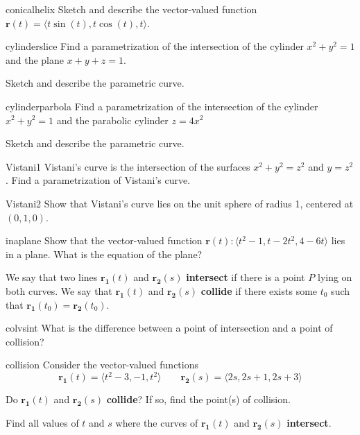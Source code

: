 \begin{problem}{conicalhelix}
Sketch and describe the vector-valued function $\bm{r}(t) = \langle t\sin(t), t\cos(t), t \rangle$.  
\end{problem}

\begin{problem}{cylinderslice}
Find a parametrization of the intersection of the cylinder $x^2 + y^2 = 1$ and the plane $x + y + z = 1$.

Sketch and describe the parametric curve.
\end{problem}

\begin{problem}{cylinderparbola}
Find a parametrization of the intersection of the cylinder $x^2 + y^2 = 1$ and the parabolic cylinder $z = 4x^2$

Sketch and describe the parametric curve.
\end{problem}

\begin{problem}{Vistani1}
Vistani's curve is the intersection of the surfaces $x^2 + y^2 = z^2$ and $y=z^2$.  Find a parametrization of Vistani's curve.
\end{problem}

\begin{problem}{Vistani2}
Show that Vistani's curve lies on the unit sphere of radius 1, centered at $(0,1,0)$.
\end{problem}

\begin{problem}{inaplane}
    Show that the vector-valued function $\bm{r}(t) : \langle t^2-1, t-2t^2, 4-6t \rangle$ lies in a plane.  What is the equation of the plane?
\end{problem}

We say that two lines $\bm{r_1}(t)$ and $\bm{r_2}(s)$ \textbf{intersect} if there is a point $P$ lying on both curves.  We say that $\bm{r_1}(t)$ and $\bm{r_2}(s)$ \textbf{collide} if there exists some $t_0$ such that $\bm{r_1}(t_0) = \bm{r_2}(t_0)$.

\begin{problem}{colvsint}
What is the difference between a point of intersection and a point of collision?
\end{problem}

\begin{problem}{collision}
Consider the vector-valued functions $$\bm{r_1}(t) = \langle t^2 - 3, -1, t^2 \rangle \qquad \bm{r_2}(s) = \langle 2s, 2s+1, 2s+3 \rangle$$

\begin{subproblems}
\item Do $\bm{r_1}(t)$ and $\bm{r_2}(s)$ \textbf{collide}?  If so, find the point(s) of collision.
\item Find all values of $t$ and $s$ where the curves of $\bm{r_1}(t)$ and $\bm{r_2}(s)$ \textbf{intersect}.
\end{subproblems}

\end{problem}










